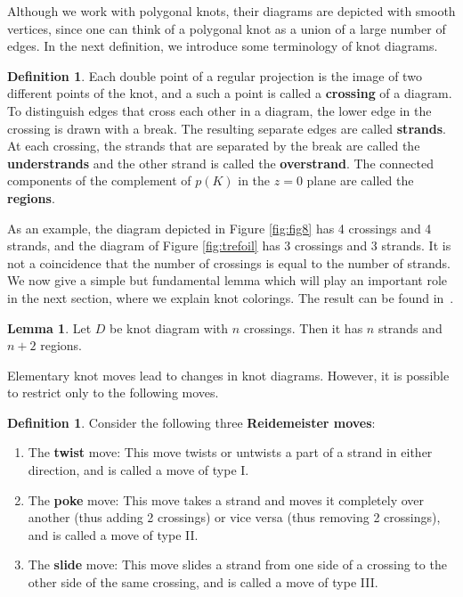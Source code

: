 \documentclass[11pt,a4paper]{article}
\theoremstyle{definition}
\newtheorem{lemma}[theorem]{Lemma}
\newtheorem{definition}[theorem]{Definition}
\begin{document}
Although we work with polygonal knots, their diagrams are depicted with smooth vertices, since one can think of a polygonal knot as a union of a large number of  edges. In the next definition, we introduce some terminology of knot diagrams.


\begin{definition} 
Each double point of a regular projection is the image of two different points of the knot, and a such a point is called a \textbf{crossing} of a diagram. To distinguish edges that cross each other in a diagram, the lower edge in the crossing is drawn with a break. The resulting separate edges are called \textbf{strands}. At each crossing, the strands that are separated by the break are called the \textbf{understrands} and the other strand is called the \textbf{overstrand}. The connected components of the complement of $p(K)$ in the $z=0$ plane are called the \textbf{regions}. 

\end{definition}

As an example, the diagram depicted in Figure \ref{fig:fig8} has 4 crossings and 4 strands, and the diagram of Figure \ref{fig:trefoil} has 3 crossings and 3 strands. It is not a coincidence that the number of crossings is equal to the number of strands. We now give a simple but fundamental lemma which will play an important role in the next section, where we explain knot colorings. The result can be found in~\cite{alexander1928topological}.

\begin{lemma}
\label{lem:knot_diag}
Let $D$ be knot diagram with $n$ crossings. Then it has $n$ strands and $n+2$ regions.
\end{lemma}

Elementary knot moves lead to changes in knot diagrams. However, it is possible to
restrict only to the following moves. 




\begin{definition}
\label{def:reidemeister}
Consider the following three \textbf{Reidemeister moves}:
\begin{enumerate}[label= \Roman*.]
\item The \textbf{twist} move: This move twists or untwists a part of a strand in either direction, and is called a move of type I.
\item  The \textbf{poke} move: This move takes a strand and moves it completely over another (thus adding 2 crossings) or vice versa (thus removing 2 crossings), and is called a move of type II. 
\item  The \textbf{slide} move: This move slides a strand from one side of a crossing to the other side of the same crossing, and is called a move of type III.
\end{enumerate}
\end{definition}
\end{document}

